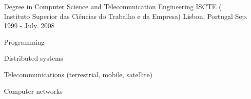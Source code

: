 

\begin{cventries}

  \cventry
    {Degree in Computer Science and Telecomunication Engineering} %
    {ISCTE ( Instituto Superior das Ciências do Trabalho e da Empresa)} %
    {Lisbon, Portugal} %
    {Sep. 1999 - July. 2008} %
    {
      \begin{cvitems} %
        \item Programming
        \item Distributed systems
        \item Telecommunications (terrestrial, mobile, satellite)
        \item Computer networks
        \itemElectronics
        
      \end{cvitems}
    }

\end{cventries}
